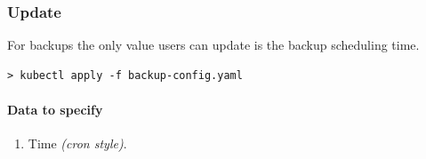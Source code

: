 \subsubsection*{Update}

For backups the only value users can update is the backup 
scheduling time.

\begin{lstlisting}
> kubectl apply -f backup-config.yaml
\end{lstlisting}

\paragraph{Data to specify}
\begin{enumerate}
    \item Time \textit{(cron style)}.
\end{enumerate}
